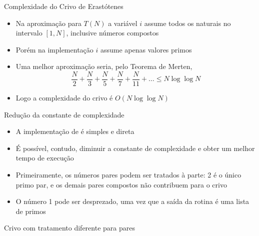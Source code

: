 \begin{frame}[fragile]{Complexidade do Crivo de Erastótenes}

    \begin{itemize}
        \item Na aproximação para $T(N)$ a variável $i$ assume todos os naturais no intervalo 
            $[1, N]$, inclusive números compostos

        \item Porém na implementação $i$ assume apenas valores primos

        \item Uma melhor aproximação seria, pelo Teorema de Merten,
$$
\frac{N}{2} + \frac{N}{3} + \frac{N}{5} + \frac{N}{7} + \frac{N}{11} + \ldots \leq N\log\log N
$$

        \item Logo a complexidade do crivo é $O(N\log \log N)$
    \end{itemize}

\end{frame}

\begin{frame}[fragile]{Redução da constante de complexidade}

    \begin{itemize}
        \item A implementação de  é simples e direta

        \item É possível, contudo, diminuir a constante de complexidade e obter um melhor tempo de
            execução

        \item Primeiramente, os números pares podem ser tratados à parte: 2 é o único primo par, e
            os demais pares compostos não contribuem para o crivo

        \item O número 1 pode ser desprezado, uma vez que a saída da rotina é uma lista de primos

    \end{itemize}

\end{frame}

\begin{frame}[fragile]{Crivo com tratamento diferente para pares}
\end{frame}


